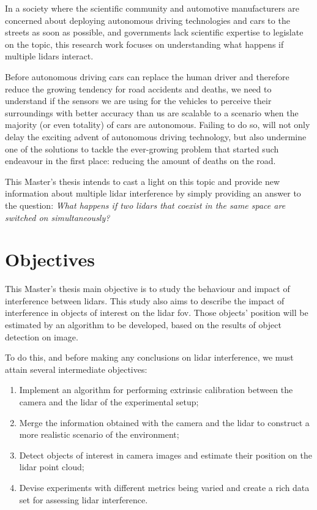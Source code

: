 In a society where the scientific community and automotive manufacturers are concerned about deploying autonomous driving technologies and cars to the streets as soon as possible, and governments lack scientific expertise to legislate on the topic, this research work focuses on understanding what happens if multiple \acp{lidar} interact.

Before autonomous driving cars can replace the human driver and therefore reduce the growing
tendency for road accidents and deaths, we need to understand if the sensors we are using for the vehicles to perceive their surroundings with better accuracy than us are scalable to a scenario when the majority (or even totality) of cars are autonomous. Failing to do so, will not only delay the exciting advent of autonomous driving technology, but also undermine one of the solutions to tackle the ever-growing problem that started such endeavour in the first place: reducing the amount of deaths on the road.

This Master's thesis intends to cast a light on this topic and provide new information about multiple \ac{lidar} interference by simply providing an answer to the question: \textit{What happens if two \acp{lidar} that coexist in the same space are switched on simultaneously?} 


\section{Objectives}
\label{sec:introduction:objectives}
This Master's thesis main objective is to study the behaviour and impact of interference between \acp{lidar}. This study also aims to describe the impact of interference in objects of interest on the \ac{lidar} \ac{fov}. Those objects' position will be estimated by an algorithm to be developed, based on the results of object detection on image.

To do this, and before making any conclusions on \ac{lidar} interference, we must attain several intermediate objectives:
\begin{enumerate}
	\item Implement an algorithm for performing extrinsic calibration between the camera and the \ac{lidar} of the experimental setup;
	\item Merge the information obtained with the camera and the \ac{lidar} to construct a more realistic scenario of the environment;
	\item Detect objects of interest in camera images and estimate their position on the	\ac{lidar} point cloud;
	\item Devise experiments with different metrics being varied and create a rich data set for assessing \ac{lidar} interference.
\end{enumerate}

